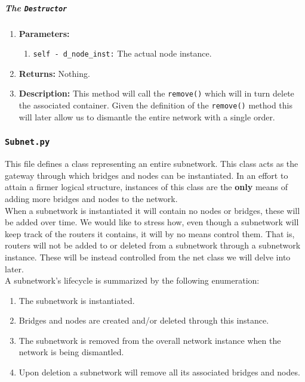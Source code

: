                    \subparagraph{The \texttt{Destructor}}
                        \begin{enumerate}
                            \item \textbf{Parameters:}
                            \begin{enumerate}
                                \item \texttt{self - d\_node\_inst:} The actual node instance.
                            \end{enumerate}
                            \item \textbf{Returns:} Nothing.
                            \item \textbf{Description:} This method will call the \texttt{remove()} which will in turn delete the associated container. Given the definition of the \texttt{remove()} method this will later allow us to dismantle the entire network with a single order.
                        \end{enumerate}

            \subsubsection{\texttt{Subnet.py}}
                This file defines a class representing an entire subnetwork. This class acts as the gateway through which bridges and nodes can be instantiated. In an effort to attain a firmer logical structure, instances of this class are the \textbf{only} means of adding more bridges and nodes to the network.\\

                When a subnetwork is instantiated it will contain no nodes or bridges, these will be added over time. We would like to stress how, even though a subnetwork will keep track of the routers it contains, it will by no means control them. That is, routers will not be added to or deleted from a subnetwork through a subnetwork instance. These will be instead controlled from the net class we will delve into later.\\

                A subnetwork's lifecycle is summarized by the following enumeration:\\

                \begin{enumerate}
                    \item The subnetwork is instantiated.
                    \item Bridges and nodes are created and/or deleted through this instance.
                    \item The subnetwork is removed from the overall network instance when the network is being dismantled.
                    \item Upon deletion a subnetwork will remove all its associated bridges and nodes.
                \end{enumerate}

